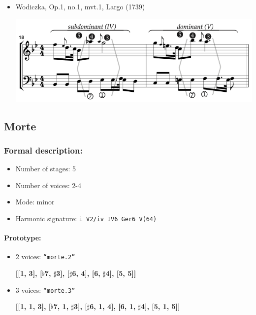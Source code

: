\documentclass[11pt, openany]{article}
\begin{document}
\begin{itemize}
\begin{center}
\end{center}
\item Wodiczka, Op.1, no.1, mvt.1, Largo (1739)
\begin{center}
\includegraphics[scale=0.5]{wodiczka1b.png}
\end{center}
\end{itemize}


	\subsection{Morte}
	
\subsubsection{Formal description:}
\begin{itemize}
\item Number of stages: 5
\item Number of voices: 2-4
\item Mode: minor
\item Harmonic signature: \texttt{i V2/iv IV6 Ger6 V(64)}
\end{itemize}

\paragraph{Prototype:}
\begin{itemize}
\item 2 voices: \texttt{“morte.2”}
	\begin{center}
	\textbf{[[1, 3], [$\flat$7, $\sharp$3], [$\sharp$6, 4], [6, $\sharp$4], [5, 5]]}
	\end{center}
\item 3 voices: \texttt{“morte.3”}
	\begin{center}
	\textbf{[[1, 1, 3], [$\flat$7, 1, $\sharp$3], [$\sharp$6, 1, 4], [6, 1, $\sharp$4], [5, 1, 5]]}
	\end{center}
\end{itemize}
\end{document}
